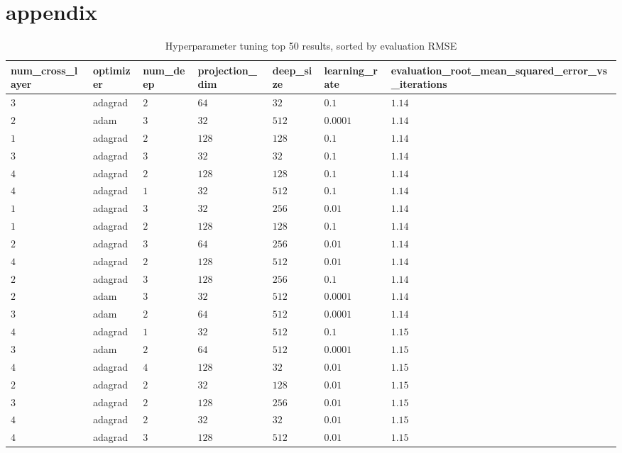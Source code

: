 \section*{appendix}
\begin{table}[hb]
    \centering
    \caption{Hyperparameter tuning top 50 results, sorted by evaluation RMSE}
    \label{tab:hyp_table}    
    \begin{tabular}{lllllll}
    \toprule
    num\_cross\_layer & optimizer & num\_deep & projection\_dim & deep\_size & learning\_rate & evaluation\_root\_mean\_squared\_error\_vs\_iterations \\ \midrule
    $3$ & adagrad & $2$ & $64$ & $32$ & $0.1$ & $1.14$ \\
    $2$ & adam & $3$ & $32$ & $512$ & $0.0001$ & $1.14$ \\
    $1$ & adagrad & $2$ & $128$ & $128$ & $0.1$ & $1.14$ \\
    $3$ & adagrad & $3$ & $32$ & $32$ & $0.1$ & $1.14$ \\
    $4$ & adagrad & $2$ & $128$ & $128$ & $0.1$ & $1.14$ \\
    $4$ & adagrad & $1$ & $32$ & $512$ & $0.1$ & $1.14$ \\
    $1$ & adagrad & $3$ & $32$ & $256$ & $0.01$ & $1.14$ \\
    $1$ & adagrad & $2$ & $128$ & $128$ & $0.1$ & $1.14$ \\
    $2$ & adagrad & $3$ & $64$ & $256$ & $0.01$ & $1.14$ \\
    $4$ & adagrad & $2$ & $128$ & $512$ & $0.01$ & $1.14$ \\
    $2$ & adagrad & $3$ & $128$ & $256$ & $0.1$ & $1.14$ \\
    $2$ & adam & $3$ & $32$ & $512$ & $0.0001$ & $1.14$ \\
    $3$ & adam & $2$ & $64$ & $512$ & $0.0001$ & $1.14$ \\
    $4$ & adagrad & $1$ & $32$ & $512$ & $0.1$ & $1.15$ \\
    $3$ & adam & $2$ & $64$ & $512$ & $0.0001$ & $1.15$ \\
    $4$ & adagrad & $4$ & $128$ & $32$ & $0.01$ & $1.15$ \\
    $2$ & adagrad & $2$ & $32$ & $128$ & $0.01$ & $1.15$ \\
    $3$ & adagrad & $2$ & $128$ & $256$ & $0.01$ & $1.15$ \\
    $4$ & adagrad & $2$ & $32$ & $32$ & $0.01$ & $1.15$ \\
    $4$ & adagrad & $3$ & $128$ & $512$ & $0.01$ & $1.15$ \\

\end{tabular}
\end{table}
